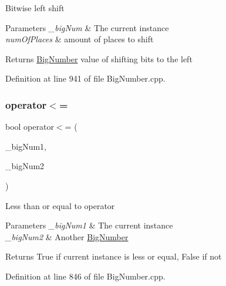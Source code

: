 Bitwise left shift 
\begin{DoxyParams}{Parameters}
{\em \+\_\+big\+Num} & The current instance \\
\hline
{\em num\+Of\+Places} & amount of places to shift \\
\hline
\end{DoxyParams}
\begin{DoxyReturn}{Returns}
\mbox{\hyperlink{class_big_nums_1_1_big_number}{Big\+Number}} value of shifting bits to the left 
\end{DoxyReturn}


Definition at line 941 of file Big\+Number.\+cpp.

\mbox{\label{class_big_nums_1_1_big_number_a787ad7c1ee1b244a545034fbe1e09431}} 
\subsubsection{\texorpdfstring{operator$<$=}{operator<=}\hspace{0.1cm}{\footnotesize\ttfamily [1/2]}}
{\footnotesize\ttfamily bool operator$<$= (\begin{DoxyParamCaption}\item[{const \mbox{\hyperlink{class_big_nums_1_1_big_number}{Big\+Number}} \&}]{\+\_\+big\+Num1,  }\item[{const \mbox{\hyperlink{class_big_nums_1_1_big_number}{Big\+Number}} \&}]{\+\_\+big\+Num2 }\end{DoxyParamCaption})\hspace{0.3cm}{\ttfamily [friend]}}

Less than or equal to operator 
\begin{DoxyParams}{Parameters}
{\em \+\_\+big\+Num1} & The current instance \\
\hline
{\em \+\_\+big\+Num2} & Another \mbox{\hyperlink{class_big_nums_1_1_big_number}{Big\+Number}} \\
\hline
\end{DoxyParams}
\begin{DoxyReturn}{Returns}
True if current instance is less or equal, False if not 
\end{DoxyReturn}


Definition at line 846 of file Big\+Number.\+cpp.

\mbox{\label{class_big_nums_1_1_big_number_a05bfb6df81cae921364aec33df340215}} 

